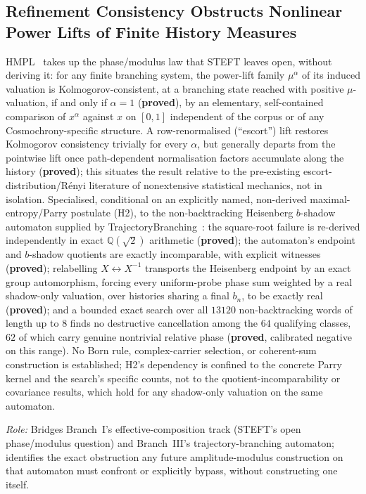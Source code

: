 \documentclass[11pt,a4paper]{article}
\newcommand{\sproved}{\textcolor{cproved}{\textbf{proved}}}
\begin{document}
  \subsection{Refinement Consistency Obstructs Nonlinear Power Lifts of Finite History Measures}
    \label{sec:hmpl}

    HMPL~\cite{Beau2026hmpl} takes up the phase/modulus law that STEFT leaves open, without deriving it: for
    any finite branching system, the power-lift family $\mu^\alpha$ of its induced valuation is
    Kolmogorov-consistent, at a branching state reached with positive $\mu$-valuation, if and only if
    $\alpha=1$ (\sproved), by an elementary, self-contained comparison of $x^\alpha$ against $x$ on $[0,1]$
    independent of the corpus or of any Cosmochrony-specific structure.
    A row-renormalised (``escort'') lift restores Kolmogorov consistency trivially for every $\alpha$, but
    generally departs from the pointwise lift once path-dependent normalisation factors accumulate along the
    history (\sproved); this situates the result relative to the pre-existing escort-distribution/R\'enyi
    literature of nonextensive statistical mechanics, not in isolation.
    Specialised, conditional on an explicitly named, non-derived maximal-entropy/Parry postulate
    (\textup{H2}), to the non-backtracking Heisenberg $b$-shadow automaton supplied by
    TrajectoryBranching~\cite{Beau2026tb}: the square-root failure is re-derived independently in exact
    $\mathbb{Q}(\sqrt2)$ arithmetic (\sproved); the automaton's endpoint and $b$-shadow quotients are exactly
    incomparable, with explicit witnesses (\sproved); relabelling $X\leftrightarrow X^{-1}$ transports the
    Heisenberg endpoint by an exact group automorphism, forcing every uniform-probe phase sum weighted by a
    real shadow-only valuation, over histories sharing a final $b_n$, to be exactly real (\sproved); and a
    bounded exact search over all $13120$ non-backtracking words of length up to $8$ finds no destructive
    cancellation among the $64$ qualifying classes, $62$ of which carry genuine nontrivial relative phase
    (\sproved, calibrated negative on this range).
    No Born rule, complex-carrier selection, or coherent-sum construction is established; \textup{H2}'s
    dependency is confined to the concrete Parry kernel and the search's specific counts, not to the
    quotient-incomparability or covariance results, which hold for any shadow-only valuation on the same
    automaton.

    \textit{Role:} Bridges Branch~I's effective-composition track (STEFT's open phase/modulus question) and
    Branch~III's trajectory-branching automaton; identifies the exact obstruction any future amplitude-modulus
    construction on that automaton must confront or explicitly bypass, without constructing one itself.
\end{document}
